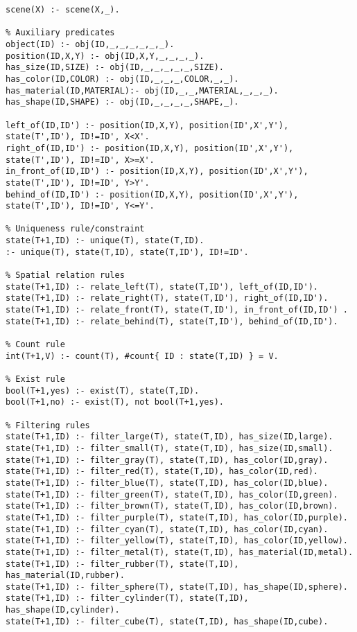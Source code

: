 \begin{lstlisting}
scene(X) :- scene(X,_).

% Auxiliary predicates
object(ID) :- obj(ID,_,_,_,_,_,_).
position(ID,X,Y) :- obj(ID,X,Y,_,_,_,_).
has_size(ID,SIZE) :- obj(ID,_,_,_,_,_,SIZE).
has_color(ID,COLOR) :- obj(ID,_,_,_,COLOR,_,_).
has_material(ID,MATERIAL):- obj(ID,_,_,MATERIAL,_,_,_).
has_shape(ID,SHAPE) :- obj(ID,_,_,_,_,SHAPE,_).

left_of(ID,ID') :- position(ID,X,Y), position(ID',X',Y'), state(T',ID'), ID!=ID', X<X'.
right_of(ID,ID') :- position(ID,X,Y), position(ID',X',Y'), state(T',ID'), ID!=ID', X>=X'.
in_front_of(ID,ID') :- position(ID,X,Y), position(ID',X',Y'), state(T',ID'), ID!=ID', Y>Y'.
behind_of(ID,ID') :- position(ID,X,Y), position(ID',X',Y'), state(T',ID'), ID!=ID', Y<=Y'.

% Uniqueness rule/constraint
state(T+1,ID) :- unique(T), state(T,ID).
:- unique(T), state(T,ID), state(T,ID'), ID!=ID'.

% Spatial relation rules
state(T+1,ID) :- relate_left(T), state(T,ID'), left_of(ID,ID').
state(T+1,ID) :- relate_right(T), state(T,ID'), right_of(ID,ID').
state(T+1,ID) :- relate_front(T), state(T,ID'), in_front_of(ID,ID') .
state(T+1,ID) :- relate_behind(T), state(T,ID'), behind_of(ID,ID').

% Count rule
int(T+1,V) :- count(T), #count{ ID : state(T,ID) } = V.

% Exist rule
bool(T+1,yes) :- exist(T), state(T,ID).
bool(T+1,no) :- exist(T), not bool(T+1,yes).

% Filtering rules
state(T+1,ID) :- filter_large(T), state(T,ID), has_size(ID,large).
state(T+1,ID) :- filter_small(T), state(T,ID), has_size(ID,small).
state(T+1,ID) :- filter_gray(T), state(T,ID), has_color(ID,gray).
state(T+1,ID) :- filter_red(T), state(T,ID), has_color(ID,red).
state(T+1,ID) :- filter_blue(T), state(T,ID), has_color(ID,blue).
state(T+1,ID) :- filter_green(T), state(T,ID), has_color(ID,green).
state(T+1,ID) :- filter_brown(T), state(T,ID), has_color(ID,brown).
state(T+1,ID) :- filter_purple(T), state(T,ID), has_color(ID,purple).
state(T+1,ID) :- filter_cyan(T), state(T,ID), has_color(ID,cyan).
state(T+1,ID) :- filter_yellow(T), state(T,ID), has_color(ID,yellow).
state(T+1,ID) :- filter_metal(T), state(T,ID), has_material(ID,metal).
state(T+1,ID) :- filter_rubber(T), state(T,ID), has_material(ID,rubber).
state(T+1,ID) :- filter_sphere(T), state(T,ID), has_shape(ID,sphere).
state(T+1,ID) :- filter_cylinder(T), state(T,ID), has_shape(ID,cylinder).
state(T+1,ID) :- filter_cube(T), state(T,ID), has_shape(ID,cube).


\end{lstlisting}
